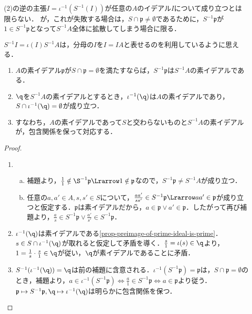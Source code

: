 \documentclass[uplatex,dvipdfmx]{jsreport}
\renewcommand{\p}{\mathfrak{p}}
\begin{document}
\begin{remark}
    (2)の逆の主張$I=\iota^{-1}(S^{-1}(I))$が任意の$A$のイデアル$I$について成り立つとは限らない．
    が，これが失敗する場合は，$S\cap\p\ne\emptyset$であるために，$S^{-1}\p$が$1\in S^{-1}\p$となって$S^{-1}A$全体に拡散してしまう場合に限る．
\end{remark}
\begin{remarks}
    $S^{-1}I=\iota(I)S^{-1}A$は，分母の$I$を$I=IA$と表せるのを利用しているように思える．
\end{remarks}

\begin{proposition}[素イデアルの対応]\mbox{}\label{prop-correspondence-of-prime-ideals-of-localization}
    \begin{enumerate}
        \item $A$の素イデアル$\p$が$S\cap\p=\emptyset$を満たすならば，$S^{-1}\p$は$S^{-1}A$の素イデアルである．
        \item $\q$を$S^{-1}A$の素イデアルとするとき，$\iota^{-1}(\q)$は$A$の素イデアルであり，$S\cap\iota^{-1}(\q)=\emptyset$が成り立つ．
        \item すなわち，$A$の素イデアルであって$S$と交わらないものと$S^{-1}A$の素イデアルが，包含関係を保って対応する．
    \end{enumerate}
\end{proposition}
\begin{proof}\mbox{}
    \begin{enumerate}
        \item \begin{enumerate}[(a)]
            \item 補題より，$\frac{1}{1}\notin\S^{-1}\p\Lrarrow 1\notin\p$なので，$S^{-1}\p\ne S^{-1}A$が成り立つ．
            \item 任意の$a,a'\in A,s,s'\in S$について，$\frac{aa'}{ss'}\in S^{-1}\p\Lrarrow aa'\in\p$が成り立つと仮定する．$\p$は素イデアルだから，$a\in\p\lor a'\in\p$．したがって再び補題より，$\frac{a}{s}\in S^{-1}\p\lor\frac{a'}{s'}\in S^{-1}\p$．
        \end{enumerate}
        \item $\iota^{-1}(\q)$は素イデアルである\ref{prop-preimage-of-prime-ideal-is-prime}．$s\in S\cap\iota^{-1}(\q)$が取れると仮定して矛盾を導く．$\frac{s}{1}=\iota(s)\in\q$より，$1=\frac{1}{s}\cdot\frac{s}{1}\in\q$が従い，$\q$が素イデアルであることに矛盾．
        \item $S^{-1}(\iota^{-1}(\q))=\q$は前の補題に含意される．$\iota^{-1}(S^{-1}\p)=\p$は，$S\cap\p=\emptyset$のとき，補題より，$a\in\iota^{-1}(S^{-1}\p)\Leftrightarrow\frac{a}{1}\in S^{-1}\p\Leftrightarrow a\in\p$より従う．$\p\mapsto S^{-1}\p,\q\mapsto\iota^{-1}(\q)$は明らかに包含関係を保つ．
    \end{enumerate}
\end{proof}
\end{document}
